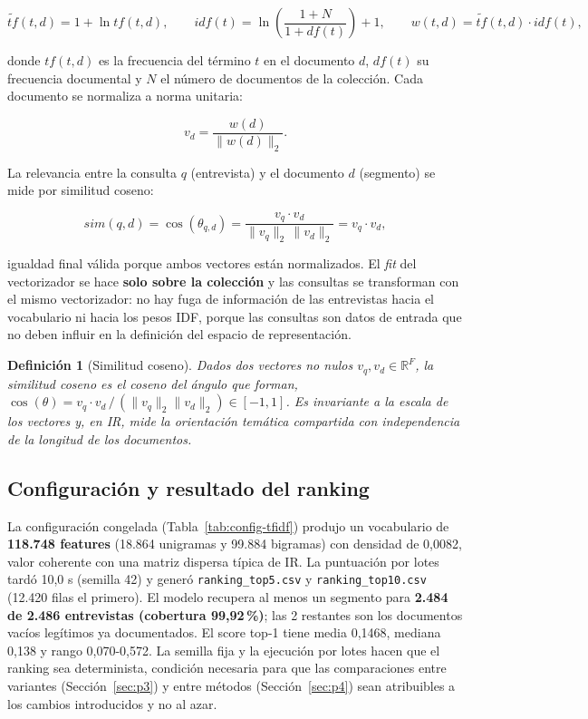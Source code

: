\documentclass[11pt]{tg_usta}
\newtheorem{definicion}{Definición}[section]
\begin{document}
\begin{equation}\label{eq:tfidf}
\widetilde{tf}(t,d) = 1+\ln tf(t,d), \qquad
idf(t) = \ln\!\left(\frac{1+N}{1+df(t)}\right)+1, \qquad
w(t,d) = \widetilde{tf}(t,d)\cdot idf(t),
\end{equation}

\noindent donde $tf(t,d)$ es la frecuencia del término $t$ en el documento $d$, $df(t)$ su frecuencia documental y $N$ el número de documentos de la colección. Cada documento se normaliza a norma unitaria:

\begin{equation}\label{eq:vector}
v_d = \frac{w(d)}{\lVert w(d)\rVert_2}.
\end{equation}

\noindent La relevancia entre la consulta $q$ (entrevista) y el documento $d$ (segmento) se mide por similitud coseno:

\begin{equation}\label{eq:coseno}
sim(q,d) = \cos(\theta_{q,d}) = \frac{v_q\cdot v_d}{\lVert v_q\rVert_2\,\lVert v_d\rVert_2} = v_q\cdot v_d,
\end{equation}

\noindent igualdad final válida porque ambos vectores están normalizados. El \textit{fit} del vectorizador se hace \textbf{solo sobre la colección} y las consultas se transforman con el mismo vectorizador: no hay fuga de información de las entrevistas hacia el vocabulario ni hacia los pesos IDF, porque las consultas son datos de entrada que no deben influir en la definición del espacio de representación.

\begin{definicion}[Similitud coseno]
Dados dos vectores no nulos $v_q, v_d \in \mathbb{R}^{F}$, la similitud coseno es el coseno del ángulo que forman, $\cos(\theta)=v_q\cdot v_d\,/\,(\lVert v_q\rVert_2\lVert v_d\rVert_2)\in[-1,1]$. Es invariante a la escala de los vectores y, en IR, mide la orientación temática compartida con independencia de la longitud de los documentos.
\end{definicion}

\subsection{Configuración y resultado del ranking}

La configuración congelada (Tabla~\ref{tab:config-tfidf}) produjo un vocabulario de \textbf{118.748 features} (18.864 unigramas y 99.884 bigramas) con densidad de 0,0082, valor coherente con una matriz dispersa típica de IR. La puntuación por lotes tardó 10,0 s (semilla 42) y generó \texttt{ranking\_top5.csv} y \texttt{ranking\_top10.csv} (12.420 filas el primero). El modelo recupera al menos un segmento para \textbf{2.484 de 2.486 entrevistas (cobertura 99,92\,\%)}; las 2 restantes son los documentos vacíos legítimos ya documentados. El score top-1 tiene media 0,1468, mediana 0,138 y rango 0,070-0,572. La semilla fija y la ejecución por lotes hacen que el ranking sea determinista, condición necesaria para que las comparaciones entre variantes (Sección~\ref{sec:p3}) y entre métodos (Sección~\ref{sec:p4}) sean atribuibles a los cambios introducidos y no al azar.
\end{document}
